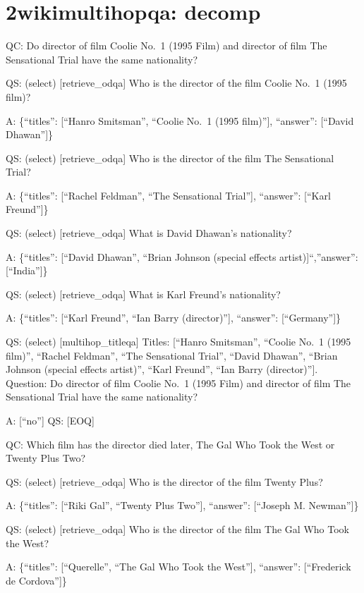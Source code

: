 \documentclass[
]{article}
\begin{document}
\section{2wikimultihopqa: decomp}\label{wikimultihopqa-decomp}

QC: Do director of film Coolie No.~1 (1995 Film) and director of film
The Sensational Trial have the same nationality?

QS: (select) {[}retrieve\_odqa{]} Who is the director of the film Coolie
No.~1 (1995 film)?

A: \{``titles'': {[}``Hanro Smitsman'', ``Coolie No.~1 (1995 film)''{]},
``answer'': {[}``David Dhawan''{]}\}

QS: (select) {[}retrieve\_odqa{]} Who is the director of the film The
Sensational Trial?

A: \{``titles'': {[}``Rachel Feldman'', ``The Sensational Trial''{]},
``answer'': {[}``Karl Freund''{]}\}

QS: (select) {[}retrieve\_odqa{]} What is David Dhawan's nationality?

A: \{``titles'': {[}``David Dhawan'', ``Brian Johnson (special effects
artist){]}``,''answer'': {[}``India''{]}\}

QS: (select) {[}retrieve\_odqa{]} What is Karl Freund's nationality?

A: \{``titles'': {[}``Karl Freund'', ``Ian Barry (director)''{]},
``answer'': {[}``Germany''{]}\}

QS: (select) {[}multihop\_titleqa{]} Titles: {[}``Hanro Smitsman'',
``Coolie No.~1 (1995 film)'', ``Rachel Feldman'', ``The Sensational
Trial'', ``David Dhawan'', ``Brian Johnson (special effects artist)'',
``Karl Freund'', ``Ian Barry (director)''{]}. Question: Do director of
film Coolie No.~1 (1995 Film) and director of film The Sensational Trial
have the same nationality?

A: {[}``no''{]} QS: {[}EOQ{]}

QC: Which film has the director died later, The Gal Who Took the West or
Twenty Plus Two?

QS: (select) {[}retrieve\_odqa{]} Who is the director of the film Twenty
Plus?

A: \{``titles'': {[}``Riki Gal'', ``Twenty Plus Two''{]}, ``answer'':
{[}``Joseph M. Newman''{]}\}

QS: (select) {[}retrieve\_odqa{]} Who is the director of the film The
Gal Who Took the West?

A: \{``titles'': {[}``Querelle'', ``The Gal Who Took the West''{]},
``answer'': {[}``Frederick de Cordova''{]}\}
\end{document}
